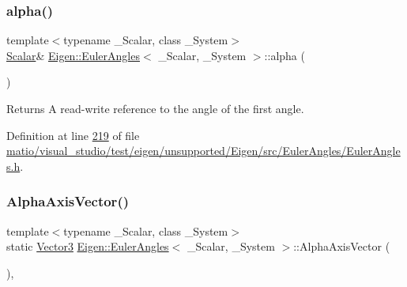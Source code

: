 \subsubsection{\texorpdfstring{alpha()}{alpha()}\hspace{0.1cm}{\footnotesize\ttfamily [4/4]}}
{\footnotesize\ttfamily template$<$typename \+\_\+\+Scalar, class \+\_\+\+System$>$ \\
\hyperlink{class_eigen_1_1_euler_angles_a2ab1d433ac9683268446f8905ac31aac}{Scalar}\& \hyperlink{class_eigen_1_1_euler_angles}{Eigen\+::\+Euler\+Angles}$<$ \+\_\+\+Scalar, \+\_\+\+System $>$\+::alpha (\begin{DoxyParamCaption}{ }\end{DoxyParamCaption})\hspace{0.3cm}{\ttfamily [inline]}}

\begin{DoxyReturn}{Returns}
A read-\/write reference to the angle of the first angle. 
\end{DoxyReturn}


Definition at line \hyperlink{matio_2visual__studio_2test_2eigen_2unsupported_2_eigen_2src_2_euler_angles_2_euler_angles_8h_source_l00219}{219} of file \hyperlink{matio_2visual__studio_2test_2eigen_2unsupported_2_eigen_2src_2_euler_angles_2_euler_angles_8h_source}{matio/visual\+\_\+studio/test/eigen/unsupported/\+Eigen/src/\+Euler\+Angles/\+Euler\+Angles.\+h}.

\mbox{\label{class_eigen_1_1_euler_angles_a33d034ea7e8cac1f4d7c329d741b9a59}} 
\subsubsection{\texorpdfstring{Alpha\+Axis\+Vector()}{AlphaAxisVector()}\hspace{0.1cm}{\footnotesize\ttfamily [1/2]}}
{\footnotesize\ttfamily template$<$typename \+\_\+\+Scalar, class \+\_\+\+System$>$ \\
static \hyperlink{class_eigen_1_1_euler_angles_af0f446aa0f46b3439abedff63fabf39c}{Vector3} \hyperlink{class_eigen_1_1_euler_angles}{Eigen\+::\+Euler\+Angles}$<$ \+\_\+\+Scalar, \+\_\+\+System $>$\+::Alpha\+Axis\+Vector (\begin{DoxyParamCaption}{ }\end{DoxyParamCaption})\hspace{0.3cm}{\ttfamily [inline]}, {\ttfamily [static]}}

